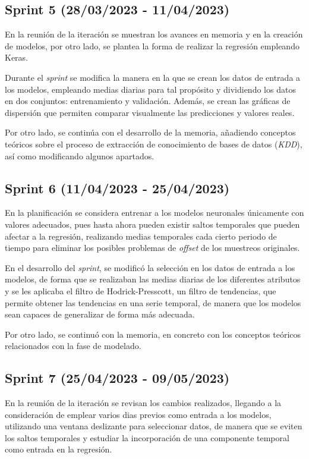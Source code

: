 \subsection{Sprint 5 (28/03/2023 - 11/04/2023)}
En la reunión de la iteración se muestran los avances en memoria y en la creación de modelos, por otro lado, se plantea la forma de realizar la regresión
empleando Keras.

Durante el \textit{sprint} se modifica la manera en la que se crean los datos de entrada a los modelos, empleando medias diarias para tal propósito y 
dividiendo los datos en dos conjuntos: entrenamiento y validación. Además, se crean las gráficas de dispersión que permiten comparar visualmente
las predicciones y valores reales.

Por otro lado, se continúa con el desarrollo de la memoria, añadiendo conceptos teóricos sobre el proceso de extracción de conocimiento de bases de datos 
(\textit{KDD}), así como modificando algunos apartados.

\subsection{Sprint 6 (11/04/2023 - 25/04/2023)}
En la planificación se considera entrenar a los modelos neuronales únicamente con valores adecuados, pues hasta ahora pueden existir saltos temporales que
pueden afectar a la regresión, realizando medias temporales cada cierto periodo de tiempo para eliminar los posibles problemas de \textit{offset} de los 
muestreos originales.

En el desarrollo del \textit{sprint}, se modificó la selección en los datos de entrada a los modelos, de forma que se realizaban las medias diarias de los
diferentes atributos y se les aplicaba el filtro de Hodrick-Presscott, un filtro de tendencias, que permite obtener las tendencias en una serie temporal,
de manera que los modelos sean capaces de generalizar de forma más adecuada.

Por otro lado, se continuó con la memoria, en concreto con los conceptos teóricos relacionados con la fase de modelado.

\subsection{Sprint 7 (25/04/2023 - 09/05/2023)}
En la reunión de la iteración se revisan los cambios realizados, llegando a la consideración de emplear varios dias previos como entrada a los modelos,
utilizando una ventana deslizante para seleccionar datos, de manera que se eviten los saltos temporales y estudiar la incorporación de una componente temporal 
como entrada en la regresión.


